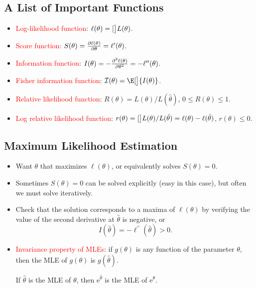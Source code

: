 \documentclass{article}\usepackage[]{graphicx}\usepackage[svgnames]{xcolor}
\let\log\relax%
\begin{document}
\subsection*{A List of Important Functions}
\begin{itemize}
      \item \textcolor{Red}{Log-likelihood function}: $ \ell(\theta)=\log[\big]{L(\theta)} $.
      \item \textcolor{Red}{Score function}: $ S(\theta)=\pdv{\ell(\theta)}{\theta}=\ell^\prime(\theta)$.
      \item \textcolor{Red}{Information function}: $ I(\theta)=-\pdv[order=2]{\ell(\theta)}{\theta}=-\ell^{\prime\prime}(\theta) $.
      \item \textcolor{Red}{Fisher information function}: $ \mathcal{I}(\theta)=\E[\big]{I(\theta)} $.
      \item \textcolor{Red}{Relative likelihood function}: $ R(\theta)=L(\theta)/L(\hat{\theta}) $, $ 0\le R(\theta)\le 1 $.
      \item \textcolor{Red}{Log relative likelihood function}: $ r(\theta)=\log[\big]{L(\theta)/L(\hat{\theta})}=\ell(\theta)-\ell(\hat{\theta}) $, $ r(\theta)\le 0 $.
\end{itemize}
\subsection*{Maximum Likelihood Estimation}
\begin{itemize}
      \item Want $ \theta $ that maximizes $ \ell(\theta) $, or equivalently solves $ S(\theta)=0 $.
      \item Sometimes $ S(\theta)=0 $ can be solved explicitly (easy in this case), but often we must solve iteratively.
      \item Check that the solution corresponds to a maxima of $ \ell(\theta) $ by verifying the value of the second derivative at $ \hat{\theta} $ is negative, or
            \[ I(\hat{\theta})=-\ell^{\prime\prime}(\hat{\theta})>0. \]
      \item \textcolor{Red}{Invariance property of MLEs}: if $ g(\theta) $ is any function of the parameter $ \theta $, then the MLE of $ g(\theta) $ is $ g(\hat{\theta}) $.
            \begin{Example}{}
                  If $ \hat{\theta} $ is the MLE of $ \theta $, then $ \mathrm{e}^{\hat{\theta}} $ is the MLE of $ \mathrm{e}^{\theta} $.
            \end{Example}
\end{itemize}
\end{document}
